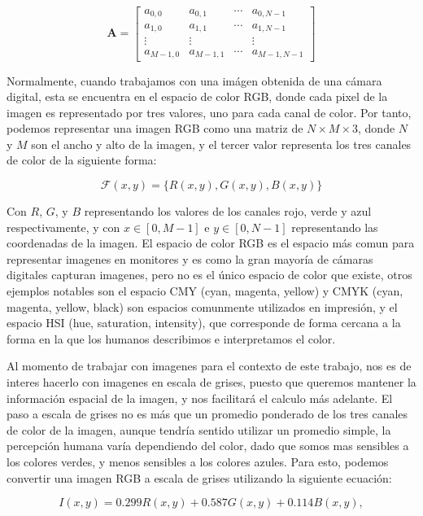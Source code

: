$$
\mathbf{A}=\left[\begin{array}{cccc}
a_{0,0} & a_{0,1} & \cdots & a_{0, N-1} \\
a_{1,0} & a_{1,1} & \cdots & a_{1, N-1} \\
\vdots & \vdots & & \vdots \\
a_{M-1,0} & a_{M-1,1} & \cdots & a_{M-1, N-1}
\end{array}\right]
$$

Normalmente, cuando trabajamos con una im\'agen obtenida de una c\'amara digital, esta se encuentra en el espacio de color RGB, donde cada pixel de la imagen es representado por tres valores, uno para cada canal de color. Por tanto, podemos representar una imagen RGB como una matriz de $N \times M \times 3$, donde $N$ y $M$ son el ancho y alto de la imagen, y el tercer valor representa los tres canales de color de la siguiente forma:

$$
\mathcal{F}(x, y)=\{R(x, y), G(x, y), B(x, y)\}
$$


Con $R$, $G$, y $B$ representando los valores de los canales rojo, verde y azul respectivamente, y con $x\in[0,M-1]$ e $y\in[0,N-1]$ representando las coordenadas de la imagen. El espacio de color RGB es el espacio m\'as comun para representar imagenes en monitores y es como la gran mayoría de c\'amaras digitales capturan imagenes, pero no es el \'unico espacio de color que existe, otros ejemplos notables son el espacio CMY (cyan, magenta, yellow) y CMYK (cyan, magenta, yellow, black) son espacios comunmente utilizados en impresi\'on, y el espacio HSI (hue, saturation, intensity), que corresponde de forma cercana a la forma en la que los humanos describimos e interpretamos el color. \cite{DigitalImageProcessing}

Al momento de trabajar con imagenes para el contexto de este trabajo, nos es de interes hacerlo con imagenes en escala de grises, puesto que queremos mantener la informaci\'on espacial de la imagen, y nos facilitar\'a el calculo m\'as adelante. El paso a escala de grises no es más que un promedio ponderado de los tres canales de color de la imagen, aunque tendría sentido utilizar un promedio simple, la percepción humana varía dependiendo del color, dado que somos mas sensibles a los colores verdes, y menos sensibles a los colores azules. Para esto, podemos convertir una imagen RGB a escala de grises utilizando la siguiente ecuaci\'on:

\begin{equation}
    I(x, y)=0.299 R(x, y)+0.587 G(x, y)+0.114 B(x, y), 
    \label{eq:grayscale}
\end{equation}


